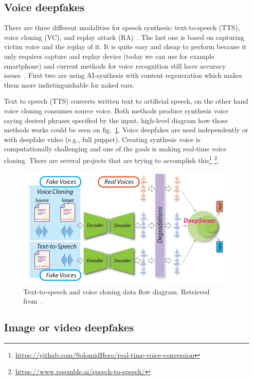 \subsection{Voice deepfakes}

There are three different modalities for speech synthesis: text-to-speech (TTS), voice cloning (VC), and replay attack (RA)~\cite{Deepsonar}. The last one is based on capturing victim voice and the replay of it. It is quite easy and cheap to perform because it only requires capture and replay device (today we can use for example smartphone) and current methods for voice recognition still have accuracy issues~\cite{ReplayAttackDetection}. First two are using AI-synthesis with content regeneration which makes them more indistinguishable for naked ears.~\cite{Deepsonar}

Text to speech (TTS) converts written text to artificial speech, on the other hand voice cloning consumes source voice. Both methods produce synthesis voice saying desired phrases specified by the input, high-level diagram how those methods works could be seen on fig.~\ref{fig:tts_vs}. Voice deepfakes are used independently or with deepfake video (e.g., full puppet). Creating synthesis voice is computationally challenging and one of the goals is making real-time voice cloning. There are several projects that are trying to accomplish this\footnote{\url{https://github.com/SolomidHero/real-time-voice-conversion}} \footnote{\url{https://www.resemble.ai/speech-to-speech/}}.

\begin{figure}[H]
    \centering
    \includegraphics[width=.62\linewidth]{other-fig/tts_vc.png}
    \caption{Text-to-speech and voice cloning data flow diagram. Retrieved from~\cite{Deepsonar}.}
\label{fig:tts_vs}
\end{figure}

\subsection{Image or video deepfakes}

